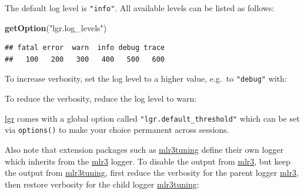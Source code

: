 \documentclass[]{scrbook}
\newenvironment{Shaded}{\begin{snugshade}}{\end{snugshade}}
\newcommand{\KeywordTok}[1]{\textcolor[rgb]{0.13,0.29,0.53}{\textbf{#1}}}
\newcommand{\NormalTok}[1]{#1}
\newcommand{\OperatorTok}[1]{\textcolor[rgb]{0.81,0.36,0.00}{\textbf{#1}}}
\newcommand{\StringTok}[1]{\textcolor[rgb]{0.31,0.60,0.02}{#1}}
\renewenvironment{Shaded} {\begin{snugshade}\small} {\end{snugshade}}
\begin{document}
The default log level is \texttt{"info"}.
All available levels can be listed as follows:

\begin{Shaded}
\begin{Highlighting}[]
\KeywordTok{getOption}\NormalTok{(}\StringTok{"lgr.log_levels"}\NormalTok{)}
\end{Highlighting}
\end{Shaded}

\begin{verbatim}
## fatal error  warn  info debug trace 
##   100   200   300   400   500   600
\end{verbatim}

To increase verbosity, set the log level to a higher value, e.g.~to \texttt{"debug"} with:

\begin{Shaded}
\end{Shaded}

To reduce the verbosity, reduce the log level to warn:

\begin{Shaded}
\end{Shaded}

\href{https://cran.r-project.org/package=lgr}{lgr} comes with a global option called \texttt{"lgr.default\_threshold"} which can be set via \texttt{options()} to make your choice permanent across sessions.

Also note that extension packages such as \href{https://mlr3tuning.mlr-org.com}{mlr3tuning} define their own logger which inherits from the \href{https://mlr3.mlr-org.com}{mlr3} logger.
To disable the output from \href{https://mlr3.mlr-org.com}{mlr3}, but keep the output from \href{https://mlr3tuning.mlr-org.com}{mlr3tuning}, first reduce the verbosity for the parent logger \href{https://mlr3.mlr-org.com}{mlr3}, then restore verbosity for the child logger \href{https://mlr3tuning.mlr-org.com}{mlr3tuning}:
\end{document}

